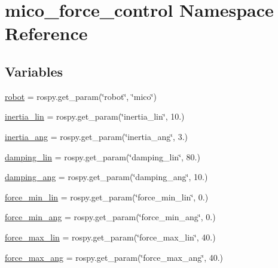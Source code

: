 \hypertarget{namespacemico__force__control}{}\section{mico\+\_\+force\+\_\+control Namespace Reference}
\label{namespacemico__force__control}
\subsection*{Variables}
\begin{DoxyCompactItemize}
\item 
\hyperlink{namespacemico__force__control_ae3d8428c9fe2a197c78735d5e2bf7d13}{robot} = rospy.\+get\+\_\+param(\char`\"{}robot\char`\"{}, \char`\"{}mico\char`\"{})
\item 
\hyperlink{namespacemico__force__control_a7bd9a03e89cd1a75c5b5fd43fe20043d}{inertia\+\_\+lin} = rospy.\+get\+\_\+param(\char`\"{}inertia\+\_\+lin\char`\"{}, 10.)
\item 
\hyperlink{namespacemico__force__control_a15342e572c568a704fb5af7c5865eae3}{inertia\+\_\+ang} = rospy.\+get\+\_\+param(\char`\"{}inertia\+\_\+ang\char`\"{}, 3.)
\item 
\hyperlink{namespacemico__force__control_a1355006730f1faaee4334f0c43f59746}{damping\+\_\+lin} = rospy.\+get\+\_\+param(\char`\"{}damping\+\_\+lin\char`\"{}, 80.)
\item 
\hyperlink{namespacemico__force__control_a92927656a13dc0f41e49ba262d47d74a}{damping\+\_\+ang} = rospy.\+get\+\_\+param(\char`\"{}damping\+\_\+ang\char`\"{}, 10.)
\item 
\hyperlink{namespacemico__force__control_a0ceb8e5eca328f479981a597d6ca88b2}{force\+\_\+min\+\_\+lin} = rospy.\+get\+\_\+param(\char`\"{}force\+\_\+min\+\_\+lin\char`\"{}, 0.)
\item 
\hyperlink{namespacemico__force__control_a6db552753f1e9477b67bafd6038452c1}{force\+\_\+min\+\_\+ang} = rospy.\+get\+\_\+param(\char`\"{}force\+\_\+min\+\_\+ang\char`\"{}, 0.)
\item 
\hyperlink{namespacemico__force__control_aa4fb6bd6977bbc2751bcc1d82e91372b}{force\+\_\+max\+\_\+lin} = rospy.\+get\+\_\+param(\char`\"{}force\+\_\+max\+\_\+lin\char`\"{}, 40.)
\item 
\hyperlink{namespacemico__force__control_a4f12ede33ebf4ea40b54445f58818f18}{force\+\_\+max\+\_\+ang} = rospy.\+get\+\_\+param(\char`\"{}force\+\_\+max\+\_\+ang\char`\"{}, 40.)
\item 

\end{DoxyCompactItemize}
